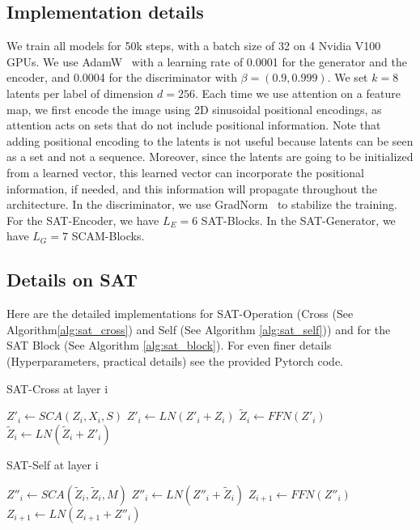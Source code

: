 \documentclass[runningheads]{llncs}
\begin{document}
\subsection{Implementation details}
We train all models for 50k steps, with a batch size of 32 on 4 Nvidia V100 GPUs. We use AdamW~\cite{loshchilov2017decoupled} with a learning rate of 0.0001 for the generator and the encoder, and 0.0004 for the discriminator with $\beta {=} (0.9,0.999)$. 
We set $k{=}8$ latents per label of dimension $d{=}256$.
Each time we use attention on a feature map, we first encode the image using 2D sinusoidal positional encodings, as attention acts on sets that do not include positional information. Note that adding positional encoding to the latents is not useful because latents can be seen as a set and not a sequence. Moreover, since the latents are going to be initialized from a learned vector, this learned vector can incorporate the positional information, if needed, and this information will propagate throughout the architecture.
In the discriminator, we use GradNorm~\cite{wu2021gradient} to stabilize the training. For the SAT-Encoder, we have $L_E=6$ SAT-Blocks. In the SAT-Generator, we have $L_G=7$ SCAM-Blocks.

\subsection{Details on SAT}
Here are the detailed implementations for SAT-Operation (Cross (See Algorithm\ref{alg:sat_cross}) and Self (See Algorithm \ref{alg:sat_self})) and for the SAT Block (See Algorithm \ref{alg:sat_block}). For even finer details (Hyperparameters, practical details) see the provided Pytorch code.


\begin{algorithm}
\caption{SAT-Cross at layer i}\label{alg:sat_cross}
$Z'_{i} \gets SCA(Z_i,X_i,S)$\;
$Z'_{i} \gets LN(Z'_{i}+Z_i)$\;
$\tilde{Z}_{i} \gets FFN(Z'_{i})$\;
$\tilde{Z}_{i} \gets LN(\tilde{Z}_{i}+Z'_{i})$\;
\end{algorithm}

\begin{algorithm}
\caption{SAT-Self at layer i}\label{alg:sat_self}
$Z''_{i} \gets SCA(\tilde{Z}_{i},\tilde{Z}_{i},M)$\;
$Z''_{i} \gets LN(Z''_{i}+\tilde{Z}_{i})$\;
$Z_{i+1} \gets FFN(Z''_{i})$\;
$Z_{i+1} \gets LN(Z_{i+1}+Z''_{i})$\;
\end{algorithm}
\end{document}
